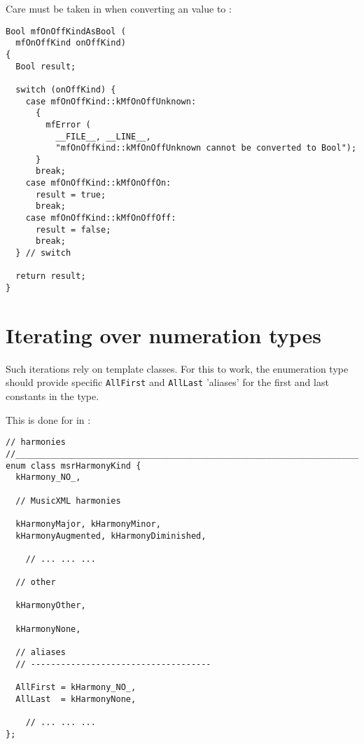 Care must be taken in  when converting an  value to :
\begin{lstlisting}[language=Terminal]
Bool mfOnOffKindAsBool (
  mfOnOffKind onOffKind)
{
  Bool result;

  switch (onOffKind) {
    case mfOnOffKind::kMfOnOffUnknown:
      {
        mfError (
          __FILE__, __LINE__,
          "mfOnOffKind::kMfOnOffUnknown cannot be converted to Bool");
      }
      break;
    case mfOnOffKind::kMfOnOffOn:
      result = true;
      break;
    case mfOnOffKind::kMfOnOffOff:
      result = false;
      break;
  } // switch

  return result;
}
\end{lstlisting}


\section{Iterating over numeration types}

Such iterations rely on template classes. For this to work, the enumeration type should provide specific {\tt AllFirst} and {\tt AllLast} 'aliases' for the first and last constants in the type.

This is done for  in :
\begin{lstlisting}[language=CPlusPlus]
// harmonies
//______________________________________________________________________________
enum class msrHarmonyKind {
  kHarmony_NO_,

  // MusicXML harmonies

  kHarmonyMajor, kHarmonyMinor,
  kHarmonyAugmented, kHarmonyDiminished,

	// ... ... ...

  // other

  kHarmonyOther,

  kHarmonyNone,

  // aliases
  // ------------------------------------

  AllFirst = kHarmony_NO_,
  AllLast  = kHarmonyNone,

	// ... ... ...
};
\end{lstlisting}

